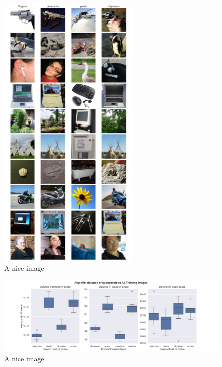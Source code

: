 \begin{figure}[ht]
    \centering
    \includegraphics[width=0.6\textwidth]{plots/dropout_similarity_plot.JPEG}
    \caption{A nice image}\label{fig:dropout_similarity_plot}
\end{figure}


\begin{figure}[ht]
    \centering
    \includegraphics[width=1\textwidth]{plots/dropout_avg_min_distance.png}
    \caption{A nice image}\label{fig:dropout_avg_min_distance}
\end{figure}

